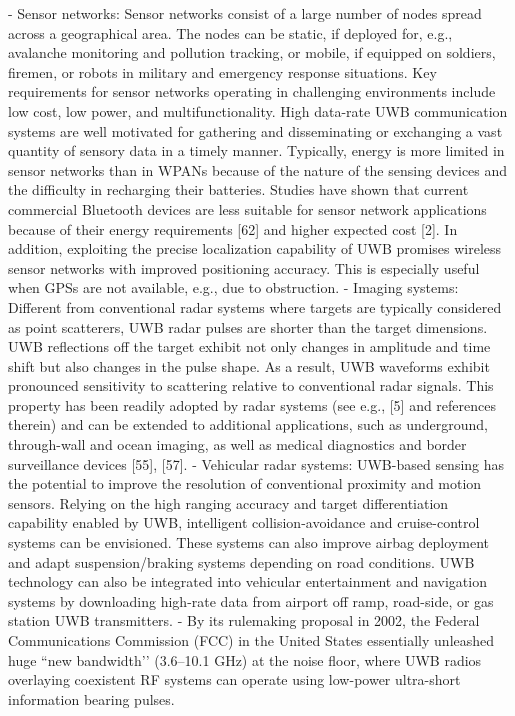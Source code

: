 	- Sensor networks: Sensor networks consist of a large number of nodes spread across a geographical area. The nodes can be static, if deployed for, e.g., avalanche monitoring and pollution tracking, or mobile, if equipped on soldiers, firemen, or robots in military and emergency response situations. Key requirements for sensor networks operating in challenging environments include low cost, low power, and multifunctionality. High data-rate UWB communication systems are well motivated for gathering and disseminating or exchanging a vast quantity of sensory data in a timely manner. Typically, energy is more limited in sensor networks than in WPANs because of the nature of the sensing devices and the difficulty in recharging their batteries. Studies have shown that current commercial Bluetooth devices are less suitable for sensor network applications because of their energy requirements [62] and higher expected cost [2]. In addition, exploiting the precise localization capability of UWB promises wireless sensor networks with improved positioning accuracy. This is especially useful when GPSs are not available, e.g., due to obstruction.
	- Imaging systems: Different from conventional radar systems where targets are typically considered as point scatterers, UWB radar pulses are shorter than the target dimensions. UWB reflections off the target exhibit not only changes in amplitude and time shift but also changes in the pulse shape. As a result, UWB waveforms exhibit pronounced sensitivity to scattering relative to conventional radar signals. This property has been readily adopted by radar systems (see e.g., [5] and references therein) and can be extended to additional applications, such as underground, through-wall and ocean imaging, as well as medical diagnostics and border surveillance devices [55], [57].
	- Vehicular radar systems: UWB-based sensing has the potential to improve the resolution of conventional proximity and motion sensors. Relying on the high ranging accuracy and target differentiation capability enabled by UWB, intelligent collision-avoidance and cruise-control systems can be envisioned. These systems can also improve airbag deployment and adapt suspension/braking systems depending on road conditions. UWB technology can also be integrated into vehicular entertainment and navigation systems by downloading high-rate data from airport off ramp, road-side, or gas station UWB transmitters.
		- By its rulemaking proposal in 2002, the Federal Communications Commission (FCC) in the United States essentially unleashed huge “new bandwidth’’ (3.6–10.1 GHz) at the noise floor, where UWB radios overlaying coexistent RF systems can operate using low-power ultra-short information bearing pulses.
	
